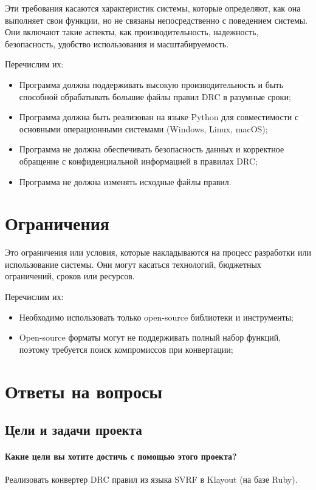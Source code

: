 Эти требования касаются характеристик системы, которые определяют,
как она выполняет свои функции,
но не связаны непосредственно с поведением системы.
Они включают такие аспекты, как производительность, надежность, безопасность,
удобство использования и масштабируемость.

Перечислим их:

\begin{itemize}
    \item Программа должна поддерживать высокую производительность
		и быть способной обрабатывать большие файлы правил DRC
		в разумные сроки;
    \item Программа должна быть реализован на языке Python для совместимости
		с основными операционными системами (Windows, Linux, macOS);
    \item Программа не должна обеспечивать безопасность данных
		и корректное обращение с конфиденциальной информацией в правилах DRC;
    \item Программа не должна изменять исходные файлы правил.
\end{itemize}

\section{Ограничения}

Это ограничения или условия,
которые накладываются на процесс разработки или использование системы.
Они могут касаться технологий, бюджетных ограничений, сроков или ресурсов.

Перечислим их:

\begin{itemize}
    \item Необходимо использовать только open-source библиотеки
		и инструменты;
    \item Open-source форматы могут не поддерживать
		полный набор функций, поэтому требуется поиск компромиссов
		при конвертации;
\end{itemize}

\section{Ответы на вопросы}

\subsection{Цели и задачи проекта}

\paragraph{Какие цели вы хотите достичь с помощью этого проекта?}
Реализовать конвертер DRC правил из языка SVRF в Klayout (на базе Ruby).


